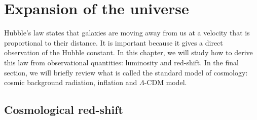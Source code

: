\chapter{Expansion of the universe}

    Hubble's law states that galaxies are moving away from us at a velocity that is proportional to their distance. It is important because it gives a direct observation of the Hubble constant. In this chapter, we will study how to derive this law from observational quantities: luminosity and red-shift. In the final section, we will briefly review what is called the standard model of cosmology: cosmic background radiation, inflation and $\Lambda$-CDM model.

\section{Cosmological red-shift}


